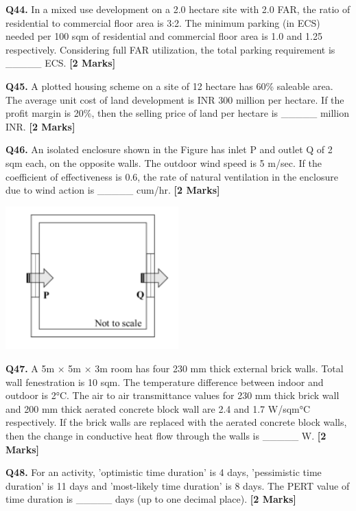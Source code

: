 \documentclass[11pt]{article}
\newcommand{\questionb}[2]{
    \noindent\textbf{Q#2.} #1 \hfill \textbf{[2 Marks]}
}
\begin{document}
\questionb{In a mixed use development on a 2.0 hectare site with 2.0 FAR, the ratio of residential to commercial floor area is 3:2. The minimum parking (in ECS) needed per 100 sqm of residential and commercial floor area is 1.0 and 1.25 respectively. Considering full FAR utilization, the total parking requirement is \_\_\_\_\_ ECS.}{44}
\vspace{0.5cm}

\questionb{A plotted housing scheme on a site of 12 hectare has 60\% saleable area. The average unit cost of land development is INR 300 million per hectare. If the profit margin is 20\%, then the selling price of land per hectare is \_\_\_\_\_ million INR.}{45}
\vspace{0.5cm}

\questionb{An isolated enclosure shown in the Figure has inlet P and outlet Q of 2 sqm each, on the opposite walls. The outdoor wind speed is 5 m/sec. If the coefficient of effectiveness is 0.6, the rate of natural ventilation in the enclosure due to wind action is \_\_\_\_\_ cum/hr.}{46}
\begin{center}
\includegraphics[width=0.5\textwidth]{figures/Q46}
\end{center}
\vspace{0.5cm}

\questionb{A 5m × 5m × 3m room has four 230 mm thick external brick walls. Total wall fenestration is 10 sqm. The temperature difference between indoor and outdoor is 2°C. The air to air transmittance values for 230 mm thick brick wall and 200 mm thick aerated concrete block wall are 2.4 and 1.7 W/sqm°C respectively. If the brick walls are replaced with the aerated concrete block walls, then the change in conductive heat flow through the walls is \_\_\_\_\_ W.}{47}
\vspace{0.5cm}

\questionb{For an activity, 'optimistic time duration' is 4 days, 'pessimistic time duration' is 11 days and 'most-likely time duration' is 8 days. The PERT value of time duration is \_\_\_\_\_ days (up to one decimal place).}{48}
\vspace{0.5cm}
\end{document}

